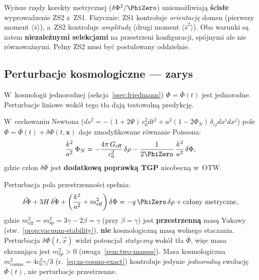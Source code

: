 \begin{remark}%
\label{rem:ZS2-niezalezny-formal}
Wy\.zsze rz\k{e}dy korekty metrycznej ($\delta\Phi^2/\PhiZero$)
uniemo\.zliwiaj\k{a} \textbf{\'scis\l{}e} wyprowadzenie ZS2 z~ZS1.
Fizycznie: ZS1 kontroluje \emph{orientacj\k{e}} domen
(pierwszy moment $\langle\hat{s}\rangle$), a~ZS2 kontroluje
\emph{amplitud\k{e}} (drugi moment $\langle\hat{s}^2\rangle$).
Oba warunki s\k{a} zatem \textbf{niezale\.znymi selekcjami}
na przestrzeni konfiguracji, sp\'ojnymi ale nie r\'ownowa\.znymi.
Pe\l{}ny ZS2 musi by\'c postulowany oddzielnie.
\end{remark}

\subsection{Perturbacje kosmologiczne --- zarys}\label{ssec:perturb}

W~kosmologii jednorodnej (sekcja~\ref{ssec:friedmann})
$\Phi = \bar{\Phi}(t)$ jest jednorodne. Perturbacje liniowe
wok\'o\l{} tego t\l{}a daj\k{a} testowaln\k{a} predykcj\k{e}.

\begin{proposition}\label{prop:poisson-mod}
W~cechowaniu Newtona ($ds^2 = -(1+2\Psi)\,c_0^2 dt^2
+ a^2(1-2\Phi_N)\,\delta_{ij}dx^i dx^j$) pole
$\Phi = \bar{\Phi}(t) + \delta\Phi(t,\mathbf{x})$ daje
zmodyfikowane r\'ownanie Poissona:
\begin{equation}\label{eq:poisson-mod}
    \frac{k^2}{a^2}\,\Phi_N
    = -\frac{4\pi\,G_{\mathrm{eff}}}{c_0^2}\,\delta\rho
      - \frac{1}{2\PhiZero}\,\frac{k^2}{a^2}\,\delta\Phi,
\end{equation}
gdzie cz\l{}on $\delta\Phi$ jest \textbf{dodatkow\k{a}
poprawką TGP} nieobecn\k{a} w~OTW.
\end{proposition}

Perturbacja pola przestrzenno\'sci spe\l{}nia:
\begin{equation}\label{eq:delta-Phi-evol}
    \ddot{\delta\Phi} + 3H\,\dot{\delta\Phi}
    + \biggl(\frac{k^2}{a^2}
    + m_{\mathrm{eff}}^2\biggr)\,\delta\Phi
    = -q\,\PhiZero\,\delta\rho + \text{cz\l{}ony metryczne},
\end{equation}
gdzie $m_{\mathrm{eff}}^2 = m_{\mathrm{sp}}^2 = 3\gamma - 2\beta = \gamma$
(przy $\beta = \gamma$) jest \textbf{przestrzenn\k{a}} mas\k{a}
Yukawy (stw.~\ref{prop:vacuum-stability}), \textbf{nie}
kosmologiczn\k{a} mas\k{a} wolnego staczania.
Perturbacja $\delta\Phi(t,\vec{x})$ widzi potencja\l{}
\emph{statyczny} wok\'o\l{} t\l{}a $\bar\Phi$, wi\k{e}c
masa ekranuj\k{a}ca jest $m_{\mathrm{sp}}^2 > 0$
(uwaga~\ref{rem:two-masses}).
Masa kosmologiczna $m_{\mathrm{cosmo}}^2 = 4c_0^2\gamma/3$
(r.~\eqref{eq:m-cosmo-exact}) kontroluje jedynie
\emph{jednorodn\k{a}} ewolucj\k{e} $\bar\Phi(t)$,
nie perturbacje przestrzenne.

